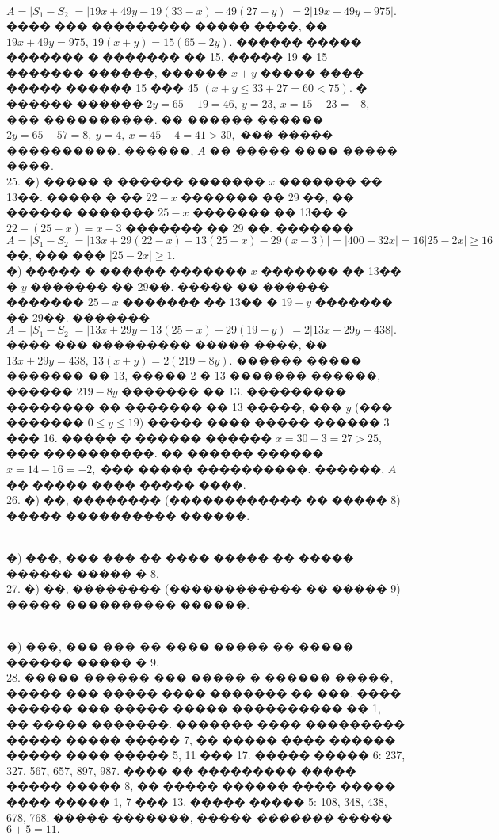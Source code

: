\documentclass[12pt]{article}
\begin{document}
$A=|S_1-S_2|=|19x+49y-19(33-x)-49(27-y)|=2|19x+49y-975|.$ ���� ��� ��������� ����� ����, �� $19x+49y=975,\ 19(x+y)=15(65-2y).$ ������ ����� ������� � ������� �� 15, ����� 19 � 15 ������� ������, ������ $x+y$ ����� ���� ����� ������ 15 ��� 45 $(x+y\leqslant33+27=60<75).$ � ������ ������ $2y=65-19=46,\ y=23,\ x=15-23=-8,$ ��� ����������. �� ������ ������ $2y=65-57=8,\ y=4,\ x=45-4=41>30,$ ��� ����� ����������. ������, $A$ �� ����� ���� ����� ����.\\
25. �) ����� � ������ ������� $x$ ������� �� 13��. ����� � �� $22-x$ ������� �� 29 ��, �� ������ ������� $25-x$ ������� �� 13�� � $22-(25-x)=x-3$ ������� �� 29 ��.
������� $A=|S_1-S_2|=|13x+29(22-x)-13(25-x)-29(x-3)|=|400-32x|=16|25-2x|\geqslant16$��, ��� ��� $|25-2x|\geqslant1.$\\
�) ����� � ������ ������� $x$ ������� �� 13�� � $y$ ������� �� 29��. ����� �� ������ ������� $25-x$ ������� �� 13�� � $19-y$ ������� �� 29��. �������
$A=|S_1-S_2|=|13x+29y-13(25-x)-29(19-y)|=2|13x+29y-438|.$ ���� ��� ��������� ����� ����, �� $13x+29y=438,\ 13(x+y)=2(219-8y).$ ������ ����� ������� �� 13, ����� 2 � 13 ������� ������, ������ $219-8y$ ������� �� 13. ��������� �������� �� ������� �� 13 �����, ��� $y$ (��� ������� $0\leqslant y\leqslant19)$ ����� ���� ����� ������ 3 ��� 16. ����� � ������ ������ $x=30-3=27>25,$ ��� ����������. �� ������ ������ $x=14-16=-2,$ ��� ����� ����������. ������, $A$ �� ����� ���� ����� ����.\\
26. �) ��, �������� (������������ �� ����� 8) ����� ���������� ������.
\begin{figure}[ht!]
\end{figure}\\
�) ���, ��� ��� �� ���� ����� �� ����� ������ ����� � 8.\\
27. �) ��, �������� (������������ �� ����� 9) ����� ���������� ������.
\begin{figure}[ht!]
\end{figure}\\
�) ���, ��� ��� �� ���� ����� �� ����� ������ ����� � 9.\\
28. ����� ������ ��� ����� � ������ �����, ����� ��� ����� ���� ������� �� ���. ���� ������ ��� ����� ����� ���������� �� 1, �� ����� �������. ������� ���� ��������� ����� ����� ����� 7, �� ����� ���� ������ ����� ���� ����� 5, 11 ��� 17. ����� ����� 6: 237, 327, 567, 657, 897, 987. ���� �� ��������� ����� ����� ����� 8, �� ����� ������ ���� ����� ���� ����� 1, 7 ��� 13. ����� ����� 5: 108, 348, 438, 678, 768. ����� �������, ����� {\it �������} ����� $6+5=11.$\\
\end{document}
